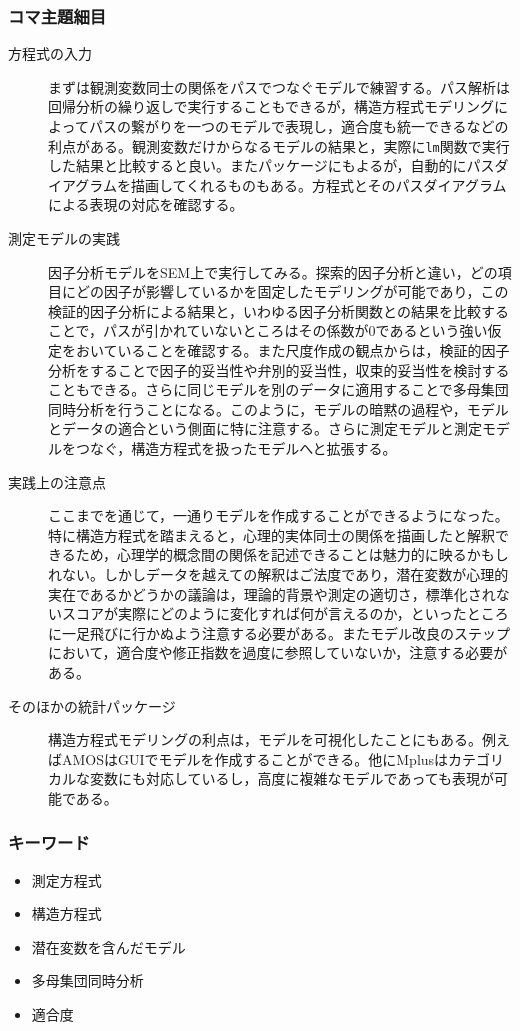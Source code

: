 \subsubsection{コマ主題細目}
\begin{description}
    \item[方程式の入力] まずは観測変数同士の関係をパスでつなぐモデルで練習する。パス解析は回帰分析の繰り返しで実行することもできるが，構造方程式モデリングによってパスの繋がりを一つのモデルで表現し，適合度も統一できるなどの利点がある。観測変数だけからなるモデルの結果と，実際に\texttt{lm}関数で実行した結果と比較すると良い。またパッケージにもよるが，自動的にパスダイアグラムを描画してくれるものもある。方程式とそのパスダイアグラムによる表現の対応を確認する。
    \item[測定モデルの実践] 因子分析モデルをSEM上で実行してみる。探索的因子分析と違い，どの項目にどの因子が影響しているかを固定したモデリングが可能であり，この検証的因子分析による結果と，いわゆる因子分析関数との結果を比較することで，パスが引かれていないところはその係数が$0$であるという強い仮定をおいていることを確認する。また尺度作成の観点からは，検証的因子分析をすることで因子的妥当性や弁別的妥当性，収束的妥当性を検討することもできる。さらに同じモデルを別のデータに適用することで多母集団同時分析を行うことになる。このように，モデルの暗黙の過程や，モデルとデータの適合という側面に特に注意する。さらに測定モデルと測定モデルをつなぐ，構造方程式を扱ったモデルへと拡張する。
    \item[実践上の注意点] ここまでを通じて，一通りモデルを作成することができるようになった。特に構造方程式を踏まえると，心理的実体同士の関係を描画したと解釈できるため，心理学的概念間の関係を記述できることは魅力的に映るかもしれない。しかしデータを越えての解釈はご法度であり，潜在変数が心理的実在であるかどうかの議論は，理論的背景や測定の適切さ，標準化されないスコアが実際にどのように変化すれば何が言えるのか，といったところに一足飛びに行かぬよう注意する必要がある。またモデル改良のステップにおいて，適合度や修正指数を過度に参照していないか，注意する必要がある。
    \item[そのほかの統計パッケージ] 構造方程式モデリングの利点は，モデルを可視化したことにもある。例えばAMOSはGUIでモデルを作成することができる。他にMplusはカテゴリカルな変数にも対応しているし，高度に複雑なモデルであっても表現が可能である。
\end{description}
\subsubsection{キーワード}
\begin{itemize}
    \item 測定方程式
    \item 構造方程式
    \item 潜在変数を含んだモデル
    \item 多母集団同時分析
    \item 適合度
    \end{itemize}
